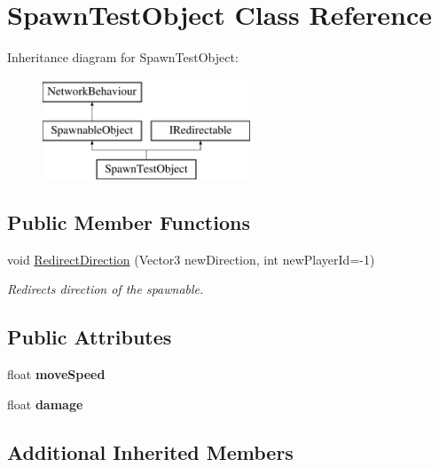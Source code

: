 \hypertarget{class_spawn_test_object}{}\section{Spawn\+Test\+Object Class Reference}
\label{class_spawn_test_object}
Inheritance diagram for Spawn\+Test\+Object\+:\begin{figure}[H]
\begin{center}
\leavevmode
\includegraphics[height=3.000000cm]{class_spawn_test_object}
\end{center}
\end{figure}
\subsection*{Public Member Functions}
\begin{DoxyCompactItemize}
\item 
void \hyperlink{class_spawn_test_object_a30ea3b6eb99e3803d605ec659c5270ce}{Redirect\+Direction} (Vector3 new\+Direction, int new\+Player\+Id=-\/1)
\begin{DoxyCompactList}\small\item\em Redirects direction of the spawnable. \end{DoxyCompactList}\end{DoxyCompactItemize}
\subsection*{Public Attributes}
\begin{DoxyCompactItemize}
\item 
\hypertarget{class_spawn_test_object_a608b8cc45c3e65c17baa66c4dd18beb8}{}\label{class_spawn_test_object_a608b8cc45c3e65c17baa66c4dd18beb8} 
float {\bfseries move\+Speed}
\item 
\hypertarget{class_spawn_test_object_ad84fcea2570a63374b58c148373a3d19}{}\label{class_spawn_test_object_ad84fcea2570a63374b58c148373a3d19} 
float {\bfseries damage}
\end{DoxyCompactItemize}
\subsection*{Additional Inherited Members}


